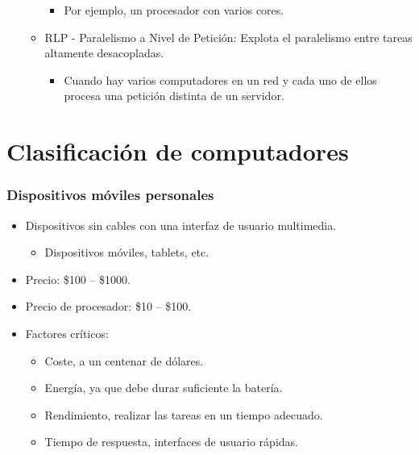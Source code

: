 \documentclass[12pt, twoside, openright]{report} %
\begin{document}
\begin{itemize}
\begin{itemize}
      \begin{itemize}
      
      \item
        Por ejemplo, un procesador con varios cores.
      \end{itemize}
    \item
      RLP - Paralelismo a Nivel de Petición: Explota el paralelismo
      entre tareas altamente desacopladas.

      \begin{itemize}
      
      \item
        Cuando hay varios computadores en un red y cada uno de ellos
        procesa una petición distinta de un servidor.
      \end{itemize}
    \end{itemize}
  \end{itemize}

  \section{Clasificación de computadores}

  
    \subsubsection{Dispositivos móviles personales}

    \begin{itemize}
    
    \item
      Dispositivos sin cables con una interfaz de usuario multimedia.

      \begin{itemize}
      
      \item
        Dispositivos móviles, tablets, etc.
      \end{itemize}
    \item
      Precio: \$100 -- \$1000.
    \item
      Precio de procesador: \$10 -- \$100.
    \item
      Factores críticos:

      \begin{itemize}
      
      \item
        Coste, a un centenar de dólares.
      \item
        Energía, ya que debe durar suficiente la batería.
      \item
        Rendimiento, realizar las tareas en un tiempo adecuado.
      \item
        Tiempo de respuesta, interfaces de usuario rápidas.
      \end{itemize}
    \end{itemize}
\end{document}
